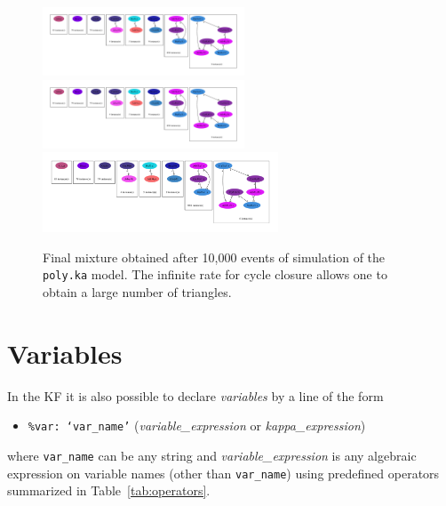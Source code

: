 \documentclass[11pt]{book}
\def\ttt#1{\texttt{#1}}
\def\ITE#1{\begin{itemize}#1\end{itemize}}
\begin{document}
\begin{figure}[htbp]
\begin{center}
\includegraphics[width=6cm]{img/mono.pdf}
\includegraphics[width=6cm]{img/dimers.pdf}\\
\includegraphics[width=7cm]{img/poly.pdf}
\caption{Final mixture obtained after 10,000 events of simulation of the \ttt{poly.ka} model. The infinite rate for cycle closure allows one to obtain a large number of triangles.}
\label{fig:species}
\end{center}
\end{figure}


\section{Variables}\label{sec:var}

In the KF it is also possible to declare \emph{variables} by a line of the form
\ITE{
\item[] \ttt{\%var: `var\_name'} (\textit{variable\_expression} or \textit{kappa\_expression})
}
where \ttt{var\_name} can be any string and \textit{variable\_expression} is any algebraic expression on variable names (other than \ttt{var\_name})  using predefined operators summarized in Table~\ref{tab:operators}.
\end{document}
